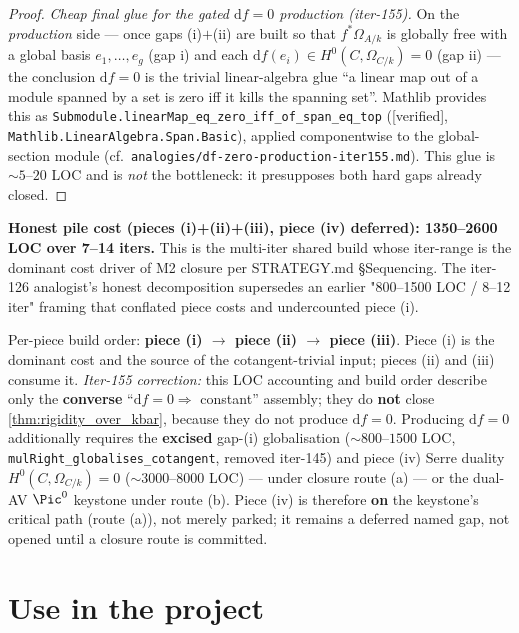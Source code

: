\begin{proof}
  \emph{Cheap final glue for the gated \(\mathrm df = 0\) production (iter-155).} On the \emph{production} side --- once gaps (i)\(+\)(ii) are built so that \(f^{*}\Omega_{A/k}\) is globally free with a global basis \(e_1, \ldots, e_g\) (gap i) and each \(\mathrm df(e_i) \in H^0(C, \Omega_{C/k}) = 0\) (gap ii) --- the conclusion \(\mathrm df = 0\) is the trivial linear-algebra glue ``a linear map out of a module spanned by a set is zero iff it kills the spanning set''. Mathlib provides this as \texttt{Submodule.linearMap\_eq\_zero\_iff\_of\_span\_eq\_top} ([verified], \texttt{Mathlib.LinearAlgebra.Span.Basic}), applied componentwise to the global-section module (cf.\ \texttt{analogies/df-zero-production-iter155.md}). This glue is \(\sim 5\)--\(20\) LOC and is \emph{not} the bottleneck: it presupposes both hard gaps already closed.
\end{proof}

\textbf{Honest pile cost (pieces (i)+(ii)+(iii), piece (iv) deferred): 1350--2600 LOC over 7--14 iters.} This is the multi-iter shared build whose iter-range is the dominant cost driver of M2 closure per STRATEGY.md \S Sequencing. The iter-126 analogist's honest decomposition supersedes an earlier "800--1500 LOC / 8--12 iter" framing that conflated piece costs and undercounted piece (i).

Per-piece build order: \textbf{piece (i) \(\to\) piece (ii) \(\to\) piece (iii)}. Piece (i) is the dominant cost and the source of the cotangent-trivial input; pieces (ii) and (iii) consume it. \emph{Iter-155 correction:} this LOC accounting and build order describe only the \textbf{converse} ``\(\mathrm df = 0 \Rightarrow\) constant'' assembly; they do \textbf{not} close \cref{thm:rigidity_over_kbar}, because they do not produce \(\mathrm df = 0\). Producing \(\mathrm df = 0\) additionally requires the \textbf{excised} gap-(i) globalisation (\(\sim 800\)--\(1500\) LOC, \texttt{mulRight\_globalises\_cotangent}, removed iter-145) and piece (iv) Serre duality \(H^0(C, \Omega_{C/k}) = 0\) (\(\sim 3000\)--\(8000\) LOC) --- under closure route (a) --- or the dual-AV \(\Pic^0\) keystone under route (b). Piece (iv) is therefore \textbf{on} the keystone's critical path (route (a)), not merely parked; it remains a deferred named gap, not opened until a closure route is committed.

\section{Use in the project}

